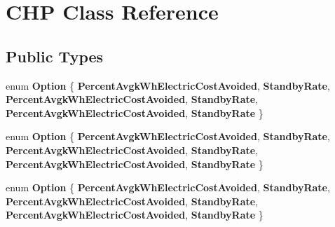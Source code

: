 \hypertarget{class_c_h_p}{}\section{C\+HP Class Reference}
\label{class_c_h_p}
\subsection*{Public Types}
\begin{DoxyCompactItemize}
\item 
\mbox{\label{class_c_h_p_ac82f530412021ace928a7e95c1295d06}} 
enum {\bfseries Option} \{ \newline
{\bfseries Percent\+Avgk\+Wh\+Electric\+Cost\+Avoided}, 
{\bfseries Standby\+Rate}, 
{\bfseries Percent\+Avgk\+Wh\+Electric\+Cost\+Avoided}, 
{\bfseries Standby\+Rate}, 
\newline
{\bfseries Percent\+Avgk\+Wh\+Electric\+Cost\+Avoided}, 
{\bfseries Standby\+Rate}
 \}
\item 
\mbox{\label{class_c_h_p_ac82f530412021ace928a7e95c1295d06}} 
enum {\bfseries Option} \{ \newline
{\bfseries Percent\+Avgk\+Wh\+Electric\+Cost\+Avoided}, 
{\bfseries Standby\+Rate}, 
{\bfseries Percent\+Avgk\+Wh\+Electric\+Cost\+Avoided}, 
{\bfseries Standby\+Rate}, 
\newline
{\bfseries Percent\+Avgk\+Wh\+Electric\+Cost\+Avoided}, 
{\bfseries Standby\+Rate}
 \}
\item 
\mbox{\label{class_c_h_p_ac82f530412021ace928a7e95c1295d06}} 
enum {\bfseries Option} \{ \newline
{\bfseries Percent\+Avgk\+Wh\+Electric\+Cost\+Avoided}, 
{\bfseries Standby\+Rate}, 
{\bfseries Percent\+Avgk\+Wh\+Electric\+Cost\+Avoided}, 
{\bfseries Standby\+Rate}, 
\newline
{\bfseries Percent\+Avgk\+Wh\+Electric\+Cost\+Avoided}, 
{\bfseries Standby\+Rate}
 \}
\end{DoxyCompactItemize}
